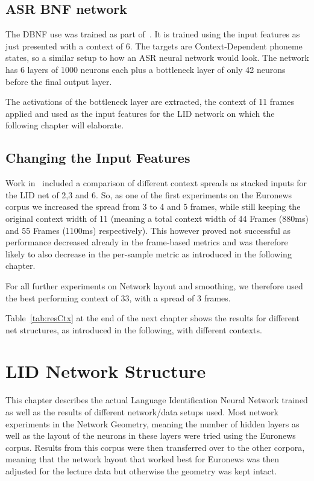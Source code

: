 \section{ASR BNF network}
\label{sec:FP:Net}

The DBNF use was trained as part of~\cite{Mueller2016b}. It is trained using the input features as just presented with a context of 6. The targets are Context-Dependent phoneme states, so a similar setup to how an ASR neural network would look. The network has 6 layers of 1000 neurons each plus a bottleneck layer of only 42 neurons before the final output layer. 

The activations of the bottleneck layer are extracted, the context of 11 frames applied and used as the input features for the LID network on which the following chapter will elaborate.


\section{Changing the Input Features}
\label{sec:LIDNetwork:Input}

Work in~\cite{Mueller2016b} included a comparison of different context spreads as stacked inputs for the LID net of 2,3 and 6. So, as one of the first experiments on the Euronews corpus we increased the spread from 3 to 4 and 5 frames, while still keeping the original context width of 11 (meaning a total context width of 44 Frames (880ms) and 55 Frames (1100ms) respectively). This however proved not successful as performance decreased already in the frame-based metrics and was therefore likely to also decrease in the per-sample metric as introduced in the following chapter. 

For all further experiments on Network layout and smoothing, we therefore used the best performing context of 33, with a spread of 3 frames.

Table~\ref{tab:resCtx} at the end of the next chapter shows the results for different net structures, as introduced in the following, with different contexts.

\chapter{LID Network Structure}
\label{ch:LIDNetwork}

This chapter describes the actual Language Identification Neural Network trained as well as the results of different network/data setups used. Most network experiments in the Network Geometry, meaning the number of hidden layers as well as the layout of the neurons in these layers were tried using the Euronews corpus. Results from this corpus were then transferred over to the other corpora, meaning that the network layout that worked best for Euronews was then adjusted for the lecture data but otherwise the geometry was kept intact.

